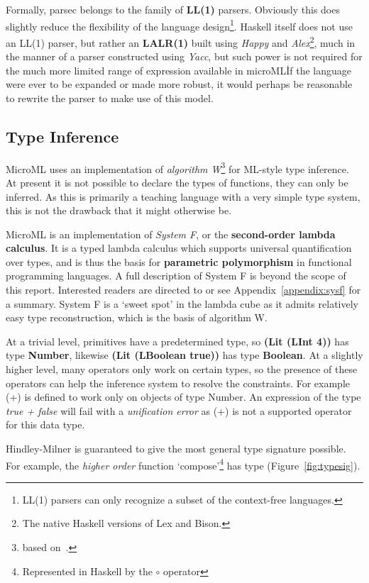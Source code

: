 \documentclass[12pt, a4paper]{report}
\begin{document}
Formally, parsec belongs to the family of \textbf{LL(1)} parsers. Obviously this does slightly
reduce the flexibility of the language design\footnote{LL(1) parsers can only recognize a subset
of the context-free languages.}. Haskell itself does not use an LL(1) parser, but rather an
\textbf{LALR(1)} built using \textit{Happy} and \textit{Alex}\footnote{The native Haskell versions
of Lex and Bison.}, much in the manner of a parser constructed using \textit{Yacc}, but such power
is not required for the much more limited range of expression available in microML\. If the language
were ever to be expanded or made more robust, it would perhaps be reasonable to rewrite the parser
to make use of this model.

\subsection{Type Inference}
\label{sec:type}
MicroML uses an implementation of \textit{algorithm W}\footnote{based on~\cite{algoW}.}
for ML-style type inference. At present it is not possible to declare the types of functions, they
can only be inferred. As this is primarily a teaching language with a very simple type system, this
is not the drawback that it might otherwise be.

MicroML is an implementation of \textit{System F}, or the \textbf{second-order lambda calculus}.
It is a typed lambda calculus which supports universal quantification over types, and is thus
the basis for \textbf{parametric polymorphism} in functional programming languages. A full
description of System F is beyond the scope of this report. Interested readers are directed to
\cite{Pierce:2002:TPL:509043} or see Appendix~\ref{appendix:sysf} for a summary. System F is a
`sweet spot' in the lambda cube as it admits relatively easy type reconstruction, which is the basis
of algorithm W.

At a trivial level, primitives have a predetermined type, so \textbf{(Lit (LInt 4))} has type
\textbf{Number}, likewise \textbf{(Lit (LBoolean true))} has type \textbf{Boolean}. At a slightly
higher level, many operators only work on certain types, so the presence of these operators can help
the inference system to resolve the constraints. For example (+) is defined to work only on objects
of type Number. An expression of the type \textit{true + false} will fail with a \textit{unification
error} as (+) is not a supported operator for this data type.

Hindley-Milner is guaranteed to give the most general type signature possible. For example, the
\textit{higher order} function `compose'\footnote{Represented in Haskell by the $\circ$ operator }
has type (Figure~\ref{fig:typesig}).
\end{document}
